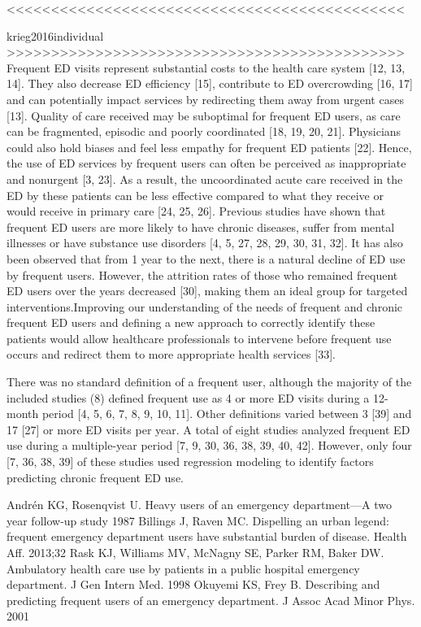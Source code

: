 <<<<<<<<<<<<<<<<<<<<<<<<<<<<<<<<<<<<<<<<<<<<<




krieg2016individual
>>>>>>>>>>>>>>>>>>>>>>>>>>>>>>>>>>>>>>>>>>>>>
Frequent ED visits represent substantial costs to the health care system [12, 13, 14]. They also decrease ED efficiency [15], contribute to ED overcrowding [16, 17] and can potentially impact services by redirecting them away from urgent cases [13]. Quality of care received may be suboptimal for frequent ED users, as care can be fragmented, episodic and poorly coordinated [18, 19, 20, 21]. Physicians could also hold biases and feel less empathy for frequent ED patients [22]. Hence, the use of ED services by frequent users can often be perceived as inappropriate and nonurgent [3, 23]. As a result, the uncoordinated acute care received in the ED by these patients can be less effective compared to what they receive or would receive in primary care [24, 25, 26]. Previous studies have shown that frequent ED users are more likely to have chronic diseases, suffer from mental illnesses or have substance use disorders [4, 5, 27, 28, 29, 30, 31, 32]. It has also been observed that from 1 year to the next, there is a natural decline of ED use by frequent users. However, the attrition rates of those who remained frequent ED users over the years decreased [30], making them an ideal group for targeted interventions.Improving our understanding of the needs of frequent and chronic frequent ED users and defining a new approach to correctly identify these patients would allow healthcare professionals to intervene before frequent use occurs and redirect them to more appropriate health services [33].

There was no standard definition of a frequent user, although the majority of the included studies (8) defined frequent use as 4 or more ED visits during a 12-month period [4, 5, 6, 7, 8, 9, 10, 11]. Other definitions varied between 3 [39] and 17 [27] or more ED visits per year. A total of eight studies analyzed frequent ED use during a multiple-year period [7, 9, 30, 36, 38, 39, 40, 42]. However, only four [7, 36, 38, 39] of these studies used regression modeling to identify factors predicting chronic frequent ED use. 

Andrén KG, Rosenqvist U. Heavy users of an emergency department—A two year follow-up study 1987
Billings J, Raven MC. Dispelling an urban legend: frequent emergency department users have substantial burden of disease. Health Aff. 2013;32
Rask KJ, Williams MV, McNagny SE, Parker RM, Baker DW. Ambulatory health care use by patients in a public hospital emergency department. J Gen Intern Med. 1998
Okuyemi KS, Frey B. Describing and predicting frequent users of an emergency department. J Assoc Acad Minor Phys. 2001


